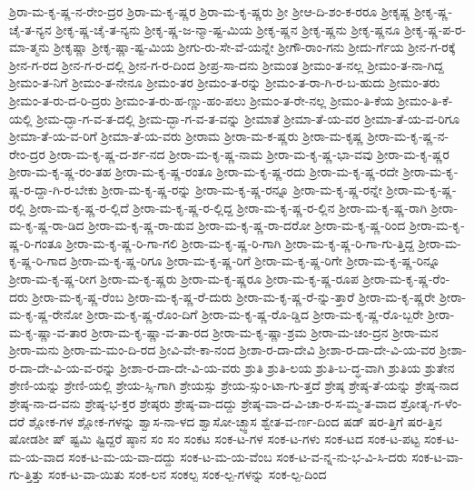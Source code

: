 {ಶ್ರಿರಾ-ಮ-ಕೃ-ಷ್ಣ-ನ-ರೇಂ-ದ್ರರ
ಶ್ರಿರಾ-ಮ-ಕೃ-ಷ್ಣರ
ಶ್ರಿರಾ-ಮ-ಕೃ-ಷ್ಣರು
ಶ್ರೀ
ಶ್ರೀಆ-ದಿ-ಶಂ-ಕ-ರರೂ
ಶ್ರೀಕೃಷ್ಣ
ಶ್ರೀಕೃ-ಷ್ಣ-ಚೈ-ತ-ನ್ಯನ
ಶ್ರೀಕೃ-ಷ್ಣ-ಚೈ-ತ-ನ್ಯನು
ಶ್ರೀಕೃ-ಷ್ಣ-ಜ-ನ್ಮಾ-ಷ್ಟ-ಮಿಯ
ಶ್ರೀಕೃ-ಷ್ಣನ
ಶ್ರೀಕೃ-ಷ್ಣನು
ಶ್ರೀಕೃ-ಷ್ಣನೂ
ಶ್ರೀಕೃ-ಷ್ಣ-ಪ-ರ-ಮಾ-ತ್ಮನು
ಶ್ರೀಕೃಷ್ಣಾ
ಶ್ರೀಕೃ-ಷ್ಣಾ-ಷ್ಟ-ಮಿಯ
ಶ್ರೀಗು-ರು-ಸೇ-ವೆ-ಯನ್ನೇ
ಶ್ರೀಗೌ-ರಾಂ-ಗನು
ಶ್ರೀದು-ರ್ಗೆಯ
ಶ್ರೀನ-ಗ-ರಕ್ಕೆ
ಶ್ರೀನ-ಗ-ರದ
ಶ್ರೀನ-ಗ-ರ-ದಲ್ಲಿ
ಶ್ರೀನ-ಗ-ರ-ದಿಂದ
ಶ್ರೀಪ್ರ-ಸಾ-ದನು
ಶ್ರೀಮಂತ
ಶ್ರೀಮಂ-ತ-ನಲ್ಲ
ಶ್ರೀಮಂ-ತ-ನಾ-ಗಿದ್ದ
ಶ್ರೀಮಂ-ತ-ನಿಗೆ
ಶ್ರೀಮಂ-ತ-ನೇನೂ
ಶ್ರೀಮಂ-ತರ
ಶ್ರೀಮಂ-ತ-ರನ್ನು
ಶ್ರೀಮಂ-ತ-ರಾ-ಗಿ-ರ-ಬ-ಹುದು
ಶ್ರೀಮಂ-ತರು
ಶ್ರೀಮಂ-ತ-ರು-ದ-ರಿ-ದ್ರರು
ಶ್ರೀಮಂ-ತ-ರು-ಹ-ಣ್ಣು-ಹಂ-ಪಲು
ಶ್ರೀಮಂ-ತ-ರೇ-ನಲ್ಲ
ಶ್ರೀಮಂ-ತಿ-ಕೆಯ
ಶ್ರೀಮಂ-ತಿ-ಕೆ-ಯಲ್ಲಿ
ಶ್ರೀಮ-ದ್ಭಾ-ಗ-ವ-ತ-ದಲ್ಲಿ
ಶ್ರೀಮ-ದ್ಭಾ-ಗ-ವ-ತ-ವನ್ನು
ಶ್ರೀಮಾತೆ
ಶ್ರೀಮಾ-ತೆ-ಯ-ವರ
ಶ್ರೀಮಾ-ತೆ-ಯ-ವ-ರಿಗೂ
ಶ್ರೀಮಾ-ತೆ-ಯ-ವ-ರಿಗೆ
ಶ್ರೀಮಾ-ತೆ-ಯ-ವರು
ಶ್ರೀರಾಮ
ಶ್ರೀರಾ-ಮ-ಕ-ಷ್ಣರು
ಶ್ರೀರಾ-ಮ-ಕೃಷ್ಣ
ಶ್ರೀರಾ-ಮ-ಕೃ-ಷ್ಣ-ನ-ರೇಂ-ದ್ರರ
ಶ್ರೀರಾ-ಮ-ಕೃ-ಷ್ಣ-ದ-ರ್ಶ-ನದ
ಶ್ರೀರಾ-ಮ-ಕೃ-ಷ್ಣ-ನಾಮ
ಶ್ರೀರಾ-ಮ-ಕೃ-ಷ್ಣ-ಭಾ-ವವು
ಶ್ರೀರಾ-ಮ-ಕೃ-ಷ್ಣರ
ಶ್ರೀರಾ-ಮ-ಕೃ-ಷ್ಣ-ರಂ-ತಹ
ಶ್ರೀರಾ-ಮ-ಕೃ-ಷ್ಣ-ರಂತೂ
ಶ್ರೀರಾ-ಮ-ಕೃ-ಷ್ಣ-ರದು
ಶ್ರೀರಾ-ಮ-ಕೃ-ಷ್ಣ-ರದೇ
ಶ್ರೀರಾ-ಮ-ಕೃ-ಷ್ಣ-ರ-ದ್ದಾ-ಗಿ-ರ-ಬೇಕು
ಶ್ರೀರಾ-ಮ-ಕೃ-ಷ್ಣ-ರನ್ನು
ಶ್ರೀರಾ-ಮ-ಕೃ-ಷ್ಣ-ರನ್ನೂ
ಶ್ರೀರಾ-ಮ-ಕೃ-ಷ್ಣ-ರನ್ನೇ
ಶ್ರೀರಾ-ಮ-ಕೃ-ಷ್ಣ-ರಲ್ಲಿ
ಶ್ರೀರಾ-ಮ-ಕೃ-ಷ್ಣ-ರ-ಲ್ಲಿದೆ
ಶ್ರೀರಾ-ಮ-ಕೃ-ಷ್ಣ-ರ-ಲ್ಲಿದ್ದ
ಶ್ರೀರಾ-ಮ-ಕೃ-ಷ್ಣ-ರ-ಲ್ಲಿನ
ಶ್ರೀರಾ-ಮ-ಕೃ-ಷ್ಣ-ರಾಗಿ
ಶ್ರೀರಾ-ಮ-ಕೃ-ಷ್ಣ-ರಾ-ಡಿದ
ಶ್ರೀರಾ-ಮ-ಕೃ-ಷ್ಣ-ರಾ-ಡುವ
ಶ್ರೀರಾ-ಮ-ಕೃ-ಷ್ಣ-ರಾ-ದರೋ
ಶ್ರೀರಾ-ಮ-ಕೃ-ಷ್ಣ-ರಿಂದ
ಶ್ರೀರಾ-ಮ-ಕೃ-ಷ್ಣ-ರಿ-ಗಂತೂ
ಶ್ರೀರಾ-ಮ-ಕೃ-ಷ್ಣ-ರಿ-ಗಾ-ಗಲಿ
ಶ್ರೀರಾ-ಮ-ಕೃ-ಷ್ಣ-ರಿ-ಗಾಗಿ
ಶ್ರೀರಾ-ಮ-ಕೃ-ಷ್ಣ-ರಿ-ಗಾ-ಗು-ತ್ತಿದ್ದ
ಶ್ರೀರಾ-ಮ-ಕೃ-ಷ್ಣ-ರಿ-ಗಾದ
ಶ್ರೀರಾ-ಮ-ಕೃ-ಷ್ಣ-ರಿಗೂ
ಶ್ರೀರಾ-ಮ-ಕೃ-ಷ್ಣ-ರಿಗೆ
ಶ್ರೀರಾ-ಮ-ಕೃ-ಷ್ಣ-ರಿಗೇ
ಶ್ರೀರಾ-ಮ-ಕೃ-ಷ್ಣ-ರಿನ್ನೂ
ಶ್ರೀರಾ-ಮ-ಕೃ-ಷ್ಣ-ರೀಗ
ಶ್ರೀರಾ-ಮ-ಕೃ-ಷ್ಣರು
ಶ್ರೀರಾ-ಮ-ಕೃ-ಷ್ಣರೂ
ಶ್ರೀರಾ-ಮ-ಕೃ-ಷ್ಣ-ರೂಪ
ಶ್ರೀರಾ-ಮ-ಕೃ-ಷ್ಣ-ರೆಂ-ದರು
ಶ್ರೀರಾ-ಮ-ಕೃ-ಷ್ಣ-ರೆಂಬ
ಶ್ರೀರಾ-ಮ-ಕೃ-ಷ್ಣ-ರೆ-ದುರು
ಶ್ರೀರಾ-ಮ-ಕೃ-ಷ್ಣ-ರೆ-ನ್ನು-ತ್ತಾರೆ
ಶ್ರೀರಾ-ಮ-ಕೃ-ಷ್ಣರೇ
ಶ್ರೀರಾ-ಮ-ಕೃ-ಷ್ಣ-ರೇನೋ
ಶ್ರೀರಾ-ಮ-ಕೃ-ಷ್ಣ-ರೊಂ-ದಿಗೆ
ಶ್ರೀರಾ-ಮ-ಕೃ-ಷ್ಣ-ರೊ-ಡ್ಡಿದ
ಶ್ರೀರಾ-ಮ-ಕೃ-ಷ್ಣ-ರೊ-ಬ್ಬರೇ
ಶ್ರೀರಾ-ಮ-ಕೃ-ಷ್ಣಾ-ವ-ತಾರ
ಶ್ರೀರಾ-ಮ-ಕೃ-ಷ್ಣಾ-ವ-ತಾ-ರದ
ಶ್ರೀರಾ-ಮ-ಕೃ-ಷ್ಣಾ-ಶ್ರಮ
ಶ್ರೀರಾ-ಮ-ಚಂ-ದ್ರನ
ಶ್ರೀರಾ-ಮನ
ಶ್ರೀರಾ-ಮನು
ಶ್ರೀರಾ-ಮ-ಮಂ-ದಿ-ರದ
ಶ್ರೀವಿ-ವೇ-ಕಾ-ನಂದ
ಶ್ರೀಶಾ-ರ-ದಾ-ದೇವಿ
ಶ್ರೀಶಾ-ರ-ದಾ-ದೇ-ವಿ-ಯ-ವರ
ಶ್ರೀಶಾ-ರ-ದಾ-ದೇ-ವಿ-ಯ-ವ-ರನ್ನು
ಶ್ರೀಶಾ-ರ-ದಾ-ದೇ-ವಿ-ಯ-ವರು
ಶ್ರುತಿ
ಶ್ರುತಿ-ಲಯ
ಶ್ರುತಿ-ಬ-ದ್ಧ-ವಾಗಿ
ಶ್ರುತಿಯ
ಶ್ರುತೇನ
ಶ್ರೇಣಿ-ಯನ್ನು
ಶ್ರೇಣಿ-ಯಲ್ಲಿ
ಶ್ರೇಯ-ಸ್ಸಿ-ಗಾಗಿ
ಶ್ರೇಯಸ್ಸು
ಶ್ರೇಯ-ಸ್ಸುಂ-ಟಾ-ಗು-ತ್ತದೆ
ಶ್ರೇಷ್ಠ
ಶ್ರೇಷ್ಠ-ತೆ-ಯನ್ನು
ಶ್ರೇಷ್ಠ-ನಾದ
ಶ್ರೇಷ್ಠ-ನಾ-ದ-ವನು
ಶ್ರೇಷ್ಠ-ಭ-ಕ್ತರ
ಶ್ರೇಷ್ಠರು
ಶ್ರೇಷ್ಠ-ವಾ-ದದ್ದು
ಶ್ರೇಷ್ಠ-ವಾ-ದ-ವಿ-ಚಾ-ರ-ಸ-ಮ್ಮ-ತ-ವಾದ
ಶ್ರೋತೃ-ಗ-ಳೆಂ-ದರೆ
ಶ್ಲೋಕ-ಗಳ
ಶ್ಲೋಕ-ಗಳನ್ನು
ಶ್ವಾಸ-ನಾ-ಳದ
ಶ್ವಾಸೋ-ಚ್ಛ್ವಾಸ
ಶ್ವೇತ-ವ-ರ್ಣ-ದಿಂದ
ಷಡ್
ಷರ-ತ್ತಿಗೆ
ಷರ-ತ್ತಿನ
ಷೋಡಶೀ
ಷ್
ಷ್ಟಮಿ
ಷ್ಟಿದ್ದರೆ
ಷ್ಠಾನ
ಸಂ
ಸಂ
ಸಂಕಟ
ಸಂಕ-ಟ-ಗಳ
ಸಂಕ-ಟ-ಗಳು
ಸಂಕ-ಟದ
ಸಂಕ-ಟ-ಪಟ್ಟ
ಸಂಕ-ಟ-ಮ-ಯ-ವಾದ
ಸಂಕ-ಟ-ಮ-ಯ-ವಾ-ದದ್ದು
ಸಂಕ-ಟ-ಮ-ಯ-ವೆಂಬ
ಸಂಕ-ಟ-ವ-ನ್ನ-ನು-ಭ-ವಿ-ಸಿ-ದರು
ಸಂಕ-ಟ-ವಾ-ಗು-ತ್ತಿತ್ತು
ಸಂಕ-ಟ-ವಾ-ಯಿತು
ಸಂಕ-ಲನ
ಸಂಕಲ್ಪ
ಸಂಕ-ಲ್ಪ-ಗಳನ್ನು
ಸಂಕ-ಲ್ಪ-ದಿಂದ
}
